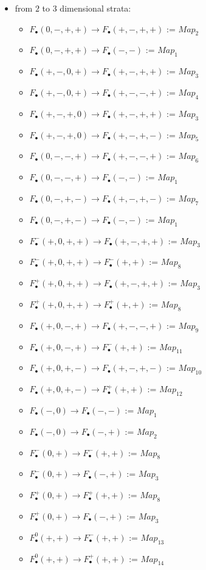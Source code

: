 \begin{itemize}
\item from $2$ to $3$ dimensional strata:
\begin{itemize}
\item $F_\bullet(0,-,+,+)\rightarrow F_\bullet(+,-,+,+)$ := $Map_2$
\item $F_\bullet(0,-,+,+)\rightarrow F_\bullet(-,-)$ := $Map_1$
\item $F_\bullet(+,-,0,+)\rightarrow F_\bullet(+,-,+,+)$ := $Map_3$
\item $F_\bullet(+,-,0,+)\rightarrow F_\bullet(+,-,-,+)$ := $Map_4$
\item $F_\bullet(+,-,+,0)\rightarrow F_\bullet(+,-,+,+)$ := $Map_3$
\item $F_\bullet(+,-,+,0)\rightarrow F_\bullet(+,-,+,-)$ := $Map_5$
\item $F_\bullet(0,-,-,+)\rightarrow F_\bullet(+,-,-,+)$ := $Map_6$
\item $F_\bullet(0,-,-,+)\rightarrow F_\bullet(-,-)$ := $Map_1$
\item $F_\bullet(0,-,+,-)\rightarrow F_\bullet(+,-,+,-)$ := $Map_7$
\item $F_\bullet(0,-,+,-)\rightarrow F_\bullet(-,-)$ := $Map_1$
\item $F_\bullet^-(+,0,+,+)\rightarrow F_\bullet(+,-,+,+)$ := $Map_3$
\item $F_\bullet^-(+,0,+,+)\rightarrow F_\bullet^-(+,+)$ := $Map_8$
\item $F_\bullet^+(+,0,+,+)\rightarrow F_\bullet(+,-,+,+)$ := $Map_3$
\item $F_\bullet^+(+,0,+,+)\rightarrow F_\bullet^+(+,+)$ := $Map_8$
\item $F_\bullet(+,0,-,+)\rightarrow F_\bullet(+,-,-,+)$ := $Map_9$
\item $F_\bullet(+,0,-,+)\rightarrow F_\bullet^-(+,+)$ := $Map_{11}$
\item $F_\bullet(+,0,+,-)\rightarrow F_\bullet(+,-,+,-)$ := $Map_{10}$
\item $F_\bullet(+,0,+,-)\rightarrow F_\bullet^+(+,+)$ := $Map_{12}$
\item $F_\bullet(-,0)\rightarrow F_\bullet(-,-)$ := $Map_1$
\item $F_\bullet(-,0)\rightarrow F_\bullet(-,+)$ := $Map_2$
\item $F_\bullet^-(0,+)\rightarrow F_\bullet^-(+,+)$ := $Map_8$
\item $F_\bullet^-(0,+)\rightarrow F_\bullet(-,+)$ := $Map_3$
\item $F_\bullet^+(0,+)\rightarrow F_\bullet^+(+,+)$ := $Map_8$
\item $F_\bullet^+(0,+)\rightarrow F_\bullet(-,+)$ := $Map_3$
\item $F_\bullet^0(+,+)\rightarrow F_\bullet^-(+,+)$ := $Map_{13}$
\item $F_\bullet^0(+,+)\rightarrow F_\bullet^+(+,+)$ := $Map_{14}$

\end{itemize}
\end{itemize}

